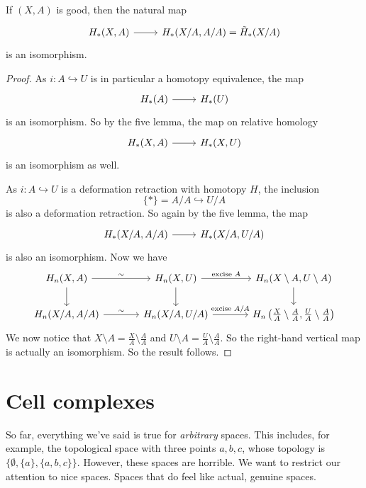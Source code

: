 \documentclass[a4paper]{article}
\theoremstyle{definition}
\begin{document}
\begin{thm}
  If $(X, A)$ is good, then the natural map
  \[
    \begin{tikzcd}
      H_*(X, A) \ar[r] & H_*(X/A, A/A) = \tilde{H}_*(X/A)
    \end{tikzcd}
  \]
  is an isomorphism.
\end{thm}

\begin{proof}
  As $i: A \hookrightarrow U$ is in particular a homotopy equivalence, the map
  \[
    \begin{tikzcd}
      H_*(A) \ar[r] & H_*(U)
    \end{tikzcd}
  \]
  is an isomorphism. So by the five lemma, the map on relative homology
  \[
    \begin{tikzcd}
      H_*(X, A) \ar[r] & H_*(X, U)
    \end{tikzcd}
  \]
  is an isomorphism as well.

  As $i: A \hookrightarrow U$ is a deformation retraction with homotopy $H$, the inclusion
  \[
    \{*\} = A/A \hookrightarrow U/A
  \]
  is also a deformation retraction. So again by the five lemma, the map
  \[
    \begin{tikzcd}
      H_*(X/A, A/A) \ar[r] & H_*(X/A, U/A)
    \end{tikzcd}
  \]
  is also an isomorphism. Now we have
  \[
    \begin{tikzcd}[column sep=large]
      H_n(X, A) \ar[d] \ar[r, "\sim"] & H_n(X, U) \ar[d] \ar[r, "\text{excise }A"] & H_n(X \setminus A, U \setminus A)\ar[d]\\
      H_n(X/A, A/A) \ar[r, "\sim"] & H_n(X/A, U/A) \ar[r, "\text{excise }A/A"] & H_n\left(\frac{X}{A}\setminus\frac{A}{A}, \frac{U}{A}\setminus\frac{A}{A}\right)
    \end{tikzcd}
  \]
  We now notice that $X\setminus A = \frac{X}{A} \setminus \frac{A}{A}$ and $U \setminus A = \frac{U}{A}\setminus \frac{A}{A}$. So the right-hand vertical map is actually an isomorphism. So the result follows.
\end{proof}


\section{Cell complexes}

So far, everything we've said is true for \emph{arbitrary} spaces. This includes, for example, the topological space with three points $a, b, c$, whose topology is $\{\emptyset, \{a\}, \{a, b, c\}\}$. However, these spaces are horrible. We want to restrict our attention to nice spaces. Spaces that do feel like actual, genuine spaces.
\end{document}

